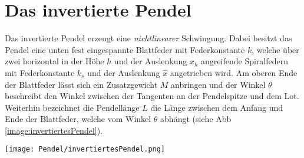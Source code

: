 

\section{Das invertierte Pendel}
\label{sec:invertPendel}
Das invertierte Pendel erzeugt eine \textit{nichtlinearer} Schwingung. Dabei besitzt das Pendel eine unten fest eingespannte Blattfeder mit Federkonstante $k$, welche über zwei horizontal in der Höhe $h$ und der Auslenkung $x_h$ angreifende Spiralfedern mit Federkonstante $k_s$ und der Auslenkung $\hat{x}$ angetrieben wird. Am oberen Ende der Blattfeder lässt sich ein Zusatzgewicht $M$ anbringen und der Winkel $\theta$ beschreibt den Winkel zwischen der Tangenten an der Pendelspitze und dem Lot. Weiterhin bezeichnet die Pendellänge $L$ die Länge zwischen dem Anfang und Ende der Blattfeder, welche vom Winkel $\theta$ abhängt (siehe Abb \ref{image:invertiertesPendel}).
\begin{center}
    \texttt{[image: Pendel/invertiertesPendel.png]}
    \label{image:invertiertesPendel}
\end{center}
